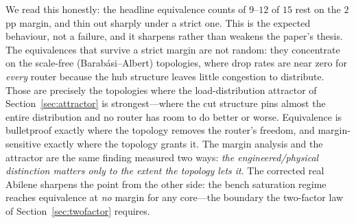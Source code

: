 We read this honestly: the headline equivalence counts of $9$--$12$ of $15$ rest
on the $2$ pp margin, and thin out sharply under a strict one. This is the
expected behaviour, not a failure, and it sharpens rather than weakens the
paper's thesis. The equivalences that survive a strict margin are not random:
they concentrate on the scale-free (Barab\'asi--Albert) topologies, where drop
rates are near zero for \emph{every} router because the hub structure leaves
little congestion to distribute. Those are precisely the topologies where the
load-distribution attractor of Section~\ref{sec:attractor} is strongest---where
the cut structure pins almost the entire distribution and no router has room to
do better or worse. Equivalence is bulletproof exactly where the topology
removes the router's freedom, and margin-sensitive exactly where the topology
grants it. The margin analysis and the attractor are the same finding measured
two ways: \emph{the engineered/physical distinction matters only to the extent
the topology lets it}. The corrected real Abilene sharpens the point from the other side: the bench saturation regime reaches equivalence at \emph{no} margin for any core---the boundary the two-factor law of Section~\ref{sec:twofactor} requires.
